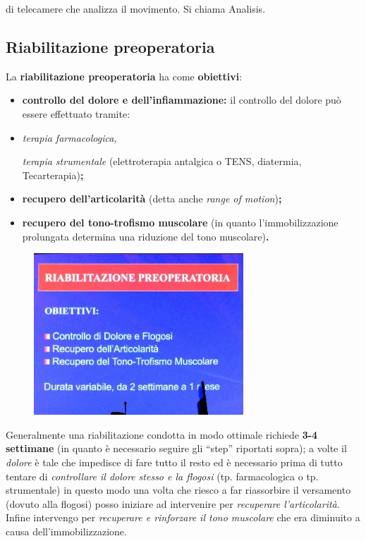 di telecamere che analizza il movimento. Si chiama Analisis.

\subsection{Riabilitazione preoperatoria}


La \textbf{riabilitazione preoperatoria} ha come \textbf{obiettivi}:

\begin{itemize}
\item
  \textbf{controllo del dolore e dell'infiammazione:} il controllo del
  dolore può essere effettuato tramite:
\end{itemize}

\begin{itemize}
 
\item
  \emph{terapia farmacologica,}

  \emph{terapia strumentale} (elettroterapia antalgica o TENS,
  diatermia, Tecarterapia)\textbf{;}
\item
  \textbf{recupero dell'articolarità} (detta anche \emph{range of
  motion})\textbf{;}
\item
\textbf{recupero del tono-trofismo muscolare} (in quanto l'immobilizzazione prolungata
  determina una riduzione del tono muscolare)\textbf{.}
\end{itemize}

\begin{figure}[!ht]
\centering
	\includegraphics[width=0.7\textwidth]{030/image1.jpeg}
\end{figure}

Generalmente una riabilitazione condotta in modo ottimale richiede
\textbf{3-4 settimane} (in quanto è necessario seguire gli ``step''
riportati sopra); a volte il \emph{dolore} è tale che impedisce di fare
tutto il resto ed è necessario prima di tutto tentare di
\emph{controllare il dolore stesso e la flogosi} (tp. farmacologica o
tp. strumentale) in questo modo una volta che riesco a far riassorbire
il versamento (dovuto alla flogosi) posso iniziare ad intervenire per
\emph{recuperare l'articolarità}. Infine intervengo per \emph{recuperare
e rinforzare il tono muscolare} che era diminuito a causa
dell'immobilizzazione.

